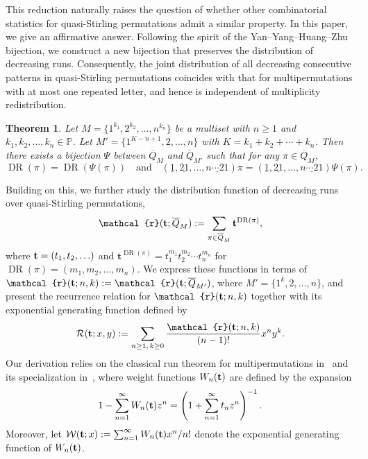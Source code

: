 \documentclass[11pt]{article}
\newcommand{\vt} { {\bf t}}
\DeclareMathOperator{\DR}{DR}
\numberwithin{equation}{section}
\newtheorem{thm}{Theorem}[section]
\def\cR{\mathcal{R}}
\def\cW{\mathcal{W}}
\def\oQ{\overline{Q}}
\newcommand{\ccr}{\mathcal{r}}
\begin{document}
This reduction naturally raises the question of whether other combinatorial statistics for quasi-Stirling permutations admit a similar property. In this paper, we give an affirmative answer. Following the spirit of the Yan–Yang–Huang–Zhu bijection, we construct a new bijection that preserves the distribution of decreasing runs. Consequently, the joint distribution of all decreasing consecutive patterns in quasi-Stirling permutations coincides with that for multipermutations with at most one repeated letter, and hence is independent of multiplicity redistribution.

\begin{thm}\label{THM:bijections-run-pattern}
	Let $M=\{1^{k_1},2^{k_2},\ldots,n^{k_n}\}$ be a multiset with $n\geq 1$ and $k_1,k_2,\ldots,k_n\in\mathbb P$. Let 
	$
	M'=\{1^{K-n+1},2,\ldots,n\}
	$ with $K=k_1+k_2+\cdots +k_n$.
	Then there exists a bijection $\Psi$ between $\overline{Q}_M$ and $\overline{Q}_{M'}$ such that for any $\pi\in \overline{Q}_M$,
	$$
	\DR(\pi)=\DR(\Psi(\pi))\quad\text{and}\quad(\underline{1},\underline{21},\ldots,\underline{n\cdots21})\pi=(\underline{1},\underline{21},\ldots,\underline{n\cdots21})\Psi(\pi).
	$$
\end{thm}

Building on this, we further study the distribution function of decreasing runs over quasi-Stirling permutations,
\[
\ccr(\vt;\oQ_M):=\sum_{\pi\in\oQ_M}\mathbf{t}^{\DR(\pi)},
\]
where $\vt=(t_1,t_2,\ldots)$ and $\mathbf{t}^{\DR(\pi)}=t_1^{m_1}t_2^{m_2}\cdots t_n^{m_n}$ for $\DR(\pi)=(m_1,m_2,\ldots,m_n)$. We express these functions
in terms of $\ccr(\vt;n,k):=\ccr(\vt;\oQ_{M'})$, where $M'=\{1^k,2,\ldots,n\}$,
and present the recurrence relation for $\ccr(\vt;n,k)$ together with its exponential generating function defined by
\begin{align}\label{EQ:def-cR}
\cR(\vt;x,y):=\sum_{n\ge1,\,k\ge0}\frac{\ccr(\vt;n,k)}{(n-1)!}x^n y^k.
\end{align}
Our derivation relies on the classical run theorem for multipermutations in~\cite{Gessel1977,Jackson1977,Goulden1983} and its specialization in~\cite{Yang2020}, where weight functions $W_n(\vt)$ are defined by the expansion
\begin{align}\label{EQ:W_n}
1-\sum_{n=1}^{\infty} W_n(\vt) z^n
= \left(1+\sum_{n=1}^{\infty} t_n z^n\right)^{-1}.
\end{align}
Moreover, let $\cW(\vt;x):=\sum_{n=1}^{\infty}W_n(\vt)x^n/n!$ denote the exponential generating function of $W_n(\vt)$.
\end{document}
